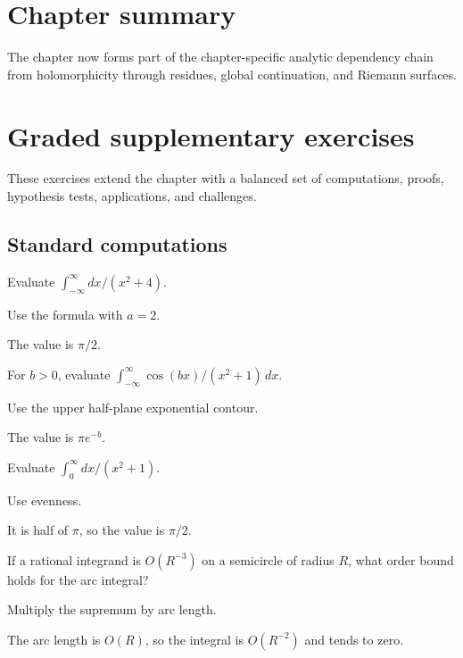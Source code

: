 \section*{Chapter summary}
The chapter now forms part of the chapter-specific analytic dependency chain from holomorphicity through residues, global continuation, and Riemann surfaces.
\section{Graded supplementary exercises}
These exercises extend the chapter with a balanced set of computations, proofs, hypothesis tests, applications, and challenges.

\subsection*{Standard computations}

\begin{exercise}\label{exr:iv11-expand-01}
Evaluate \(\int_{-\infty}^{\infty}dx/(x^2+4)\).
\end{exercise}
\begin{hint}
Use the formula with \(a=2\).
\end{hint}
\begin{solution}
The value is \(\pi/2\).
\end{solution}

\begin{exercise}\label{exr:iv11-expand-02}
For \(b>0\), evaluate \(\int_{-\infty}^{\infty}\cos(bx)/(x^2+1)\,dx\).
\end{exercise}
\begin{hint}
Use the upper half-plane exponential contour.
\end{hint}
\begin{solution}
The value is \(\pi e^{-b}\).
\end{solution}

\begin{exercise}\label{exr:iv11-expand-03}
Evaluate \(\int_0^\infty dx/(x^2+1)\).
\end{exercise}
\begin{hint}
Use evenness.
\end{hint}
\begin{solution}
It is half of \(\pi\), so the value is \(\pi/2\).
\end{solution}

\begin{exercise}\label{exr:iv11-expand-04}
If a rational integrand is \(O(R^{-3})\) on a semicircle of radius \(R\), what order bound holds for the arc integral?
\end{exercise}
\begin{hint}
Multiply the supremum by arc length.
\end{hint}
\begin{solution}
The arc length is \(O(R)\), so the integral is \(O(R^{-2})\) and tends to zero.
\end{solution}

